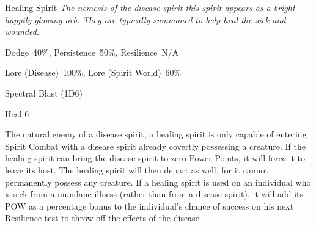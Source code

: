\begin{monsterbox}{Healing Spirit}
	\textit{The nemesis of the disease spirit this spirit appears as a bright happily glowing orb. They are typically summoned to help heal the sick and wounded.}\\
	\rpghline
	\basics[%
	powerpoints = 14,
	movementrate = 30m,
	plunderrating = 0
	]
	\rpghline%
	\stats[ %
		STR = -,
		CON = -,
		DEX = -,
		SIZ = -,
		INT = 2D6    (7),
		POW = 4D6    (14),
		CHA = 3D6    (11)
	]
	\rpghline%
	\begin{rpg-monsteraction}[Resistances]
		Dodge~40\%, Persistence~50\%, Resilience~N/A
	\end{rpg-monsteraction}
	\begin{rpg-monsteraction}[Knowledge]
		Lore (Disease)~100\%, Lore (Spirit World)~60\%
	\end{rpg-monsteraction}
	\begin{rpg-monsteraction}
		Spectral Blast (1D6)
	\end{rpg-monsteraction}
	\begin{rpg-monsteraction}
		Heal 6
	\end{rpg-monsteraction}
	\begin{rpg-monsteraction}
		The natural enemy of a disease spirit, a healing spirit is only capable of entering Spirit Combat with a disease spirit already covertly possessing a creature. If the healing spirit can bring the disease spirit to zero Power Points, it will force it to leave its host. The healing spirit will then depart as well, for it cannot permanently possess any creature. If a healing spirit is used on an individual who is sick from a mundane illness (rather than from a disease spirit), it will add its POW as a percentage bonus to the individual’s chance of success on his next Resilience test to throw off the effects of the disease.
	\end{rpg-monsteraction}
\end{monsterbox}



